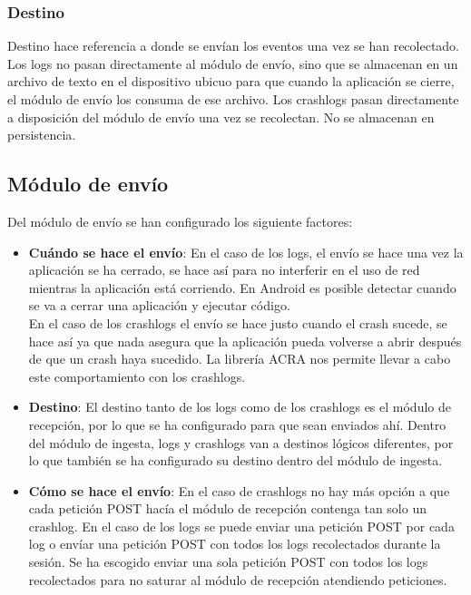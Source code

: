 \subsubsection{Destino}
Destino hace referencia a donde se envían los eventos una vez se han recolectado. 
Los logs no pasan directamente al módulo de envío, sino que se almacenan en un archivo de texto en el dispositivo ubicuo para que cuando la aplicación se cierre, el módulo de envío los consuma de ese archivo.
Los crashlogs pasan directamente a disposición del módulo de envío una vez se recolectan. No se almacenan en persistencia. 

\subsection{Módulo de envío}

Del módulo de envío se han configurado los siguiente factores:

\begin{itemize}
	\item \textbf{Cuándo se hace el envío}: En el caso de los logs, el envío se hace una vez la aplicación se ha cerrado, se hace así para no interferir en el uso de red mientras la aplicación está corriendo. En Android es posible detectar cuando se va a cerrar una aplicación y ejecutar código. \\ En el caso de los crashlogs el envío se hace justo cuando el crash sucede, se hace así ya que nada asegura que la aplicación pueda volverse a abrir después de que un crash haya sucedido. La librería ACRA nos permite llevar a cabo este comportamiento con los crashlogs.
	
	\item \textbf{Destino}: El destino tanto de los logs como de los crashlogs es el módulo de recepción, por lo que se ha configurado para que sean enviados ahí. Dentro del módulo de ingesta, logs y crashlogs van a destinos lógicos diferentes, por lo que también se ha configurado su destino dentro del módulo de ingesta.
	
	\item \textbf{Cómo se hace el envío}: En el caso de crashlogs no hay más opción a que cada petición POST hacía el módulo de recepción contenga tan solo un crashlog. En el caso de los logs se puede enviar una petición POST por cada log o envíar una petición POST con todos los logs recolectados durante la sesión. Se ha escogido enviar una sola petición POST con todos los logs recolectados para no saturar al módulo de recepción atendiendo peticiones.
\end{itemize}

